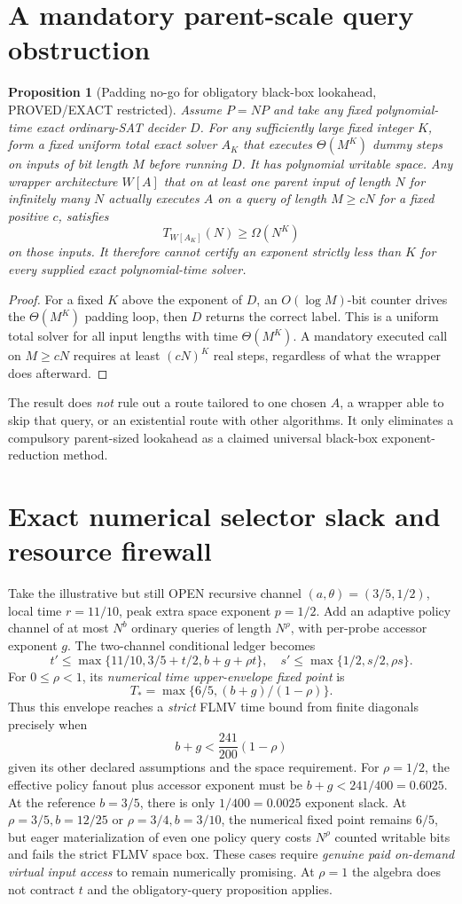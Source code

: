 \documentclass[11pt]{article}
\newtheorem{proposition}[theorem]{Proposition}
\begin{document}
\section{A mandatory parent-scale query obstruction}
\begin{proposition}[Padding no-go for obligatory black-box lookahead, PROVED/EXACT restricted]
Assume $P=NP$ and take any fixed polynomial-time exact ordinary-SAT decider $D$. For any sufficiently large fixed integer $K$, form a fixed uniform total exact solver $A_K$ that executes $\Theta(M^K)$ dummy steps on inputs of bit length $M$ before running $D$. It has polynomial writable space. Any wrapper architecture $W[A]$ that on at least one parent input of length $N$ for infinitely many $N$ \emph{actually executes} $A$ on a query of length $M\ge cN$ for a fixed positive $c$, satisfies
\[
T_{W[A_K]}(N)\ge\Omega(N^K)
\]
on those inputs. It therefore cannot certify an exponent strictly less than $K$ for \emph{every supplied} exact polynomial-time solver.
\end{proposition}
\begin{proof}
For a fixed $K$ above the exponent of $D$, an $O(\log M)$-bit counter drives the $\Theta(M^K)$ padding loop, then $D$ returns the correct label. This is a uniform total solver for all input lengths with time $\Theta(M^K)$. A mandatory executed call on $M\ge cN$ requires at least $(cN)^K$ real steps, regardless of what the wrapper does afterward.
\end{proof}
The result does \emph{not} rule out a route tailored to one chosen $A$, a wrapper able to skip that query, or an existential route with other algorithms. It only eliminates a compulsory parent-sized lookahead as a claimed universal black-box exponent-reduction method.

\section{Exact numerical selector slack and resource firewall}
Take the illustrative but still OPEN recursive channel $(a,\theta)=(3/5,1/2)$, local time $r=11/10$, peak extra space exponent $p=1/2$. Add an adaptive policy channel of at most $N^b$ ordinary queries of length $N^\rho$, with per-probe accessor exponent $g$. The two-channel conditional ledger becomes
\[
t'\le\max\{11/10,3/5+t/2,b+g+\rho t\},\quad
s'\le\max\{1/2,s/2,\rho s\}.
\]
For $0\le\rho<1$, its \emph{numerical time upper-envelope fixed point} is
\[
\boxed{T_*=\max\{6/5,(b+g)/(1-\rho)\}}.
\]
Thus this envelope reaches a \emph{strict} FLMV time bound from finite diagonals precisely when
\[
\boxed{b+g<\frac{241}{200}(1-\rho)}
\]
given its other declared assumptions and the space requirement. For $\rho=1/2$, the effective policy fanout plus accessor exponent must be $b+g<241/400=0.6025$. At the reference $b=3/5$, there is only $1/400=0.0025$ exponent slack. At $\rho=3/5,b=12/25$ or $\rho=3/4,b=3/10$, the numerical fixed point remains $6/5$, but eager materialization of even one policy query costs $N^\rho$ counted writable bits and fails the strict FLMV space box. These cases require \emph{genuine paid on-demand virtual input access} to remain numerically promising. At $\rho=1$ the algebra does not contract $t$ and the obligatory-query proposition applies.
\end{document}
